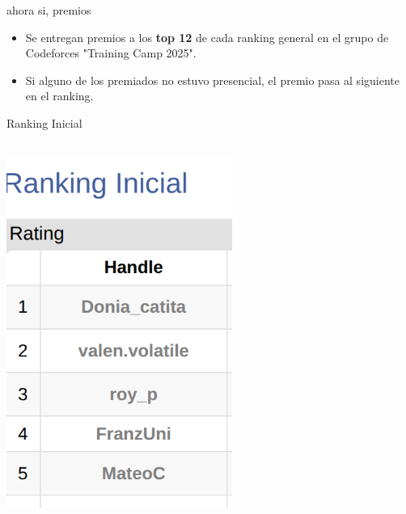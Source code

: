 \documentclass{beamer}
\begin{document}
\begin{frame}{ahora si, premios}
    \begin{itemize}
        \item Se entregan premios a los \textbf{top 12} de cada ranking general en el grupo de Codeforces "Training Camp 2025".
        \item Si alguno de los premiados no estuvo presencial, el premio pasa al siguiente en el ranking.
    \end{itemize}
\end{frame}

\begin{frame}{Ranking Inicial}
    \begin{columns}
        \centering
        \includegraphics[width=0.7\textwidth,keepaspectratio]{img/inicial-1.png}
        \centering

\end{columns}
\end{frame}
\end{document}
